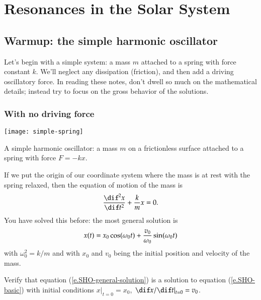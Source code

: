 \chapter{Resonances in the Solar System}

\section{Warmup: the simple harmonic oscillator}

Let's begin with a simple system: a mass $m$ attached to a spring with force constant $k$. We'll neglect any dissipation (friction), and then add a driving oscillatory force. In reading these notes, don't dwell so much on the mathematical details; instead try to focus on the gross behavior of the solutions.

\subsection{With no driving force}

\begin{marginfigure}
\texttt{[image: simple-spring]}
\caption[A simple harmonic oscillator]{A simple harmonic oscillator: a mass $m$ on a frictionless surface attached to a  spring with force $F = -kx$.
\label{f.simple-spring}}
\end{marginfigure}

If we put the origin of our coordinate system where the mass is at rest with the spring relaxed, then the equation of motion of the mass is
\begin{equation}\label{e.SHO-basic}
	\DDtt{x} + \frac{k}{m} x = 0.
\end{equation}
You have solved this before: the most general solution is
\begin{equation}\label{e.SHO-general-solution}
	x(t) = x_{0}\cos(\omega_{0} t) + \frac{v_{0}}{\omega_{0}}\sin(\omega_{0} t)
\end{equation}
with $\omega_{0}^{2} = k/m$ and with $x_{0}$ and $v_{0}$ being the initial position and velocity of the mass.

\begin{exercisebox}
Verify that equation (\ref{e.SHO-general-solution}) is a solution to equation (\ref{e.SHO-basic}) with initial conditions $\left.x\right|_{t=0}=x_{0}$, $\left.\dif x/\dif t\right|_{t=0} = v_{0}$.
\end{exercisebox}

